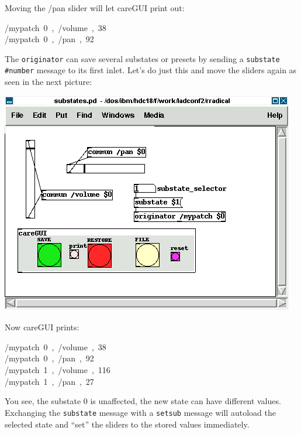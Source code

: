 \documentclass[10pt,english]{scrartcl}
\begin{document}
Moving the /pan slider will let careGUI print out:
\begin{ttfamily}\begin{flushleft}
\mbox{/mypatch~0~,~/volume~,~38}\\
\mbox{/mypatch~0~,~/pan~,~92}
\end{flushleft}\end{ttfamily}

The \texttt{originator} can save several substates or presets by sending a
\texttt{substate {\#}number} message to its first inlet. Let's do just this and
move the sliders again as seen in the next picture:

\includegraphics{substates.png}

Now careGUI prints:
\begin{ttfamily}\begin{flushleft}
\mbox{/mypatch~0~,~/volume~,~38}\\
\mbox{/mypatch~0~,~/pan~,~92}\\
\mbox{/mypatch~1~,~/volume~,~116}\\
\mbox{/mypatch~1~,~/pan~,~27}
\end{flushleft}\end{ttfamily}

You see, the substate 0 is unaffected, the new state can have different
values. Exchanging the \texttt{substate} message with a \texttt{setsub} message will
autoload the selected state and ``set'' the sliders to the stored values
immediately.



\hypertarget{osc-in-memento}{}
\end{document}
